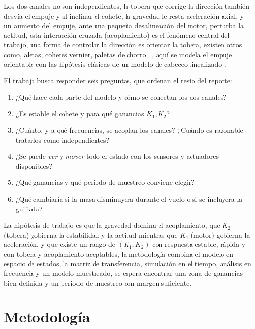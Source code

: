 \documentclass[article, 11pt]{IEEEtran}   %
\begin{document}
Los dos canales no son independientes, la tobera que corrige la direcci\'on tambi\'en desv\'ia el empuje y al inclinar el cohete, la gravedad le resta aceleraci\'on axial, y un aumento del empuje, ante una peque\~na desalineaci\'on del motor, perturba la actitud, esta interacci\'on cruzada (acoplamiento) es el fen\'omeno central del trabajo, una forma de controlar la direcci\'on es orientar la tobera, existen otros como, aletas, cohetes vernier, paletas de chorro ~\cite{nasa}, aqu\'i se modela el empuje orientable con las hip\'otesis cl\'asicas de un modelo de cabeceo linealizado~\cite{wie,greensite}.

El trabajo busca responder seis preguntas, que ordenan el resto del reporte:
\begin{enumerate}
  \item ¿Qu\'e hace cada parte del modelo y c\'omo se conectan los dos canales?
  \item ¿Es estable el cohete y para qu\'e ganancias $K_1,K_2$?
  \item ¿Cu\'anto, y a qu\'e frecuencias, se acoplan los canales? ¿Cu\'ando es razonable tratarlos como independientes?
  \item ¿Se puede \emph{ver} y \emph{mover} todo el estado con los sensores y actuadores disponibles?
  \item ¿Qu\'e ganancias y qu\'e periodo de muestreo conviene elegir?
  \item ¿Qu\'e cambiar\'ia si la masa disminuyera durante el vuelo o si se incluyera la gui\~nada?
\end{enumerate}
La hip\'otesis de trabajo es que la gravedad domina el acoplamiento, que $K_2$ (tobera) gobierna la estabilidad y la actitud mientras que $K_1$ (motor) gobierna la aceleraci\'on, y que existe un rango de $(K_1,K_2)$ con respuesta estable, r\'apida y con tobera y acoplamiento aceptables, la metodolog\'ia combina el modelo en espacio de estados, la matriz de transferencia, simulaci\'on en el tiempo, an\'alisis en frecuencia y un modelo muestreado, se espera encontrar una zona de ganancias bien definida y un periodo de muestreo con margen suficiente.

\section{Metodolog\'ia}
\end{document}
